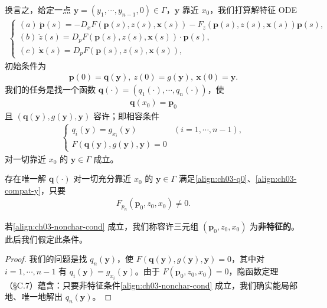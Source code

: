 \documentclass[../../main.tex]{subfiles}
\begin{document}
换言之，给定一点 $\mathbf{y}=(y_1,\cdots,y_{n-1},0)\in\Gamma$，$\mathbf{y}$ 靠近 $x_0$，我们打算解特征 ODE
\begin{align}\label{align:ch03-char-eq-repeat}
\begin{cases}
(a)\ \dot{\mathbf{p}}(s)=-D_x F(\mathbf{p}(s),z(s),\mathbf{x}(s))-F_z(\mathbf{p}(s),z(s),\mathbf{x}(s))\mathbf{p}(s),\\
(b)\ \dot{z}(s)=D_p F(\mathbf{p}(s),z(s),\mathbf{x}(s))\cdot\mathbf{p}(s),\\
(c)\ \dot{\mathbf{x}}(s)=D_p F(\mathbf{p}(s),z(s),\mathbf{x}(s)),
\end{cases}
\end{align}
初始条件为
\begin{align}\label{align:ch03-ic-y}
\mathbf{p}(0)=\mathbf{q}(\mathbf{y}),\ z(0)=g(\mathbf{y}),\ \mathbf{x}(0)=\mathbf{y}.
\end{align}
我们的任务是找一个函数 $\mathbf{q}(\cdot)=(q_1(\cdot),\cdots,q_n(\cdot))$，使
\begin{align}\label{align:ch03-q0}
\mathbf{q}(x_0)=\mathbf{p}_0
\end{align}
且 $(\mathbf{q}(\mathbf{y}),g(\mathbf{y}),\mathbf{y})$ 容许；即相容条件
\begin{align}\label{align:ch03-compat-y}
\begin{cases}
q_i(\mathbf{y})=g_{x_i}(\mathbf{y}) & (i=1,\cdots,n-1),\\
F(\mathbf{q}(\mathbf{y}),g(\mathbf{y}),\mathbf{y})=0
\end{cases}
\end{align}
对一切靠近 $x_0$ 的 $\mathbf{y}\in\Gamma$ 成立。

\begin{lemma}[非特征边界条件]\label{lemma:ch03-nonchar}存在唯一解 $\mathbf{q}(\cdot)$ 对一切充分靠近 $x_0$ 的 $\mathbf{y}\in\Gamma$ 满足\eqref{align:ch03-q0}、\eqref{align:ch03-compat-y}，只要
\begin{align}\label{align:ch03-nonchar-cond}
F_{p_n}(\mathbf{p}_0,z_0,x_0)\neq 0.
\end{align}
\end{lemma}

若\eqref{align:ch03-nonchar-cond} 成立，我们称容许三元组 $(\mathbf{p}_0,z_0,x_0)$ 为\textbf{非特征的}。此后我们假定此条件。

\begin{proof}
我们的问题是找 $q_n(\mathbf{y})$，使 $F(\mathbf{q}(\mathbf{y}),g(\mathbf{y}),\mathbf{y})=0$，其中对 $i=1,\cdots,n-1$ 有 $q_i(\mathbf{y})=g_{x_i}(\mathbf{y})$。由于 $F(\mathbf{p}_0,z_0,x_0)=0$，隐函数定理（\S C.7）蕴含：只要非特征条件\eqref{align:ch03-nonchar-cond} 成立，我们确实能局部地、唯一地解出 $q_n(\mathbf{y})$。
\end{proof}
\end{document}
